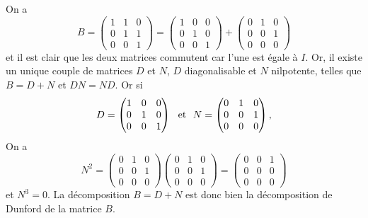 {\begin{enumerate}
{On a 
$$B=\begin{pmatrix}1 & 1 & 0 \\  0&1&1 \\ 0&0&1\end{pmatrix}=
\begin{pmatrix}1 & 0& 0 \\  0&1&0 \\ 0&0&1\end{pmatrix}+
\begin{pmatrix}0& 1 & 0 \\  0&0&1 \\ 0&0&0\end{pmatrix}$$
et il est clair que les deux matrices commutent car l'une est \'egale \`a $I$. 
Or, il existe un unique couple de matrices $D$ et $N$, $D$ diagonalisable
et $N$ nilpotente, telles que $B=D+N$ et $DN=ND$. Or si
$$D=\begin{pmatrix}1 & 0& 0 \\  0&1&0 \\ 0&0&1\end{pmatrix}\ \ {\hbox{et}}\ \ 
N=\begin{pmatrix}0& 1 & 0 \\  0&0&1 \\ 0&0&0\end{pmatrix},$$
On a 
$$N^2=\begin{pmatrix}0& 1 & 0 \\  0&0&1 \\ 0&0&0\end{pmatrix}\begin{pmatrix}0& 1 & 0 \\  0&0&1 \\ 0&0&0\end{pmatrix}=\begin{pmatrix}0& 0 & 1 \\  0&0&0 \\ 0&0&0\end{pmatrix}$$
et $N^3=0$. La d\'ecomposition $B=D+N$ est donc bien la d\'ecomposition de Dunford de la matrice $B$.}
\end{enumerate}
}